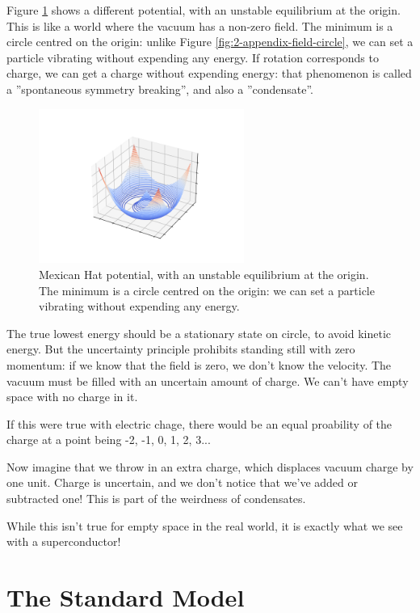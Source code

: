 \documentclass[]{article}
\begin{document}
Figure \ref{fig:mexican-hat} shows a different potential, with an unstable equilibrium at the origin. This is like a world where the vacuum has a non-zero field. The minimum is a circle centred on the origin: unlike Figure \ref{fig:2-appendix-field-circle}, we can set a particle vibrating without expending any energy. If rotation corresponds to charge, we can get a charge without expending energy: that phenomenon is called a ''spontaneous symmetry breaking'', and also a ''condensate''.
\begin{figure}[H]
	\begin{center}
		\caption[Mexican Hat potential]{Mexican Hat potential, with an unstable equilibrium at the origin.  The minimum is a circle centred on the origin: we can set a particle vibrating without expending any energy.}\label{fig:mexican-hat}
		\includegraphics[width=0.6\textwidth]{mexican-hat}
	\end{center}
\end{figure}

The true lowest energy should be a stationary state on circle, to avoid kinetic energy. But the uncertainty principle prohibits standing still with zero momentum: if we know that the field is zero, we don't know the velocity. The vacuum must be filled with an uncertain amount of charge.  We can't have empty space with no charge in it.

If this were true with electric chage, there would be an equal proability of the charge at a point being -2, -1, 0, 1, 2, 3...

Now imagine that we throw in an extra charge, which displaces vacuum charge by one unit. Charge is uncertain, and we don't notice that we've added or subtracted one! This is part of the weirdness of condensates.

While this isn't true for empty space in the real world, it is exactly what we see with a superconductor!

\section{The Standard Model}
\end{document}
